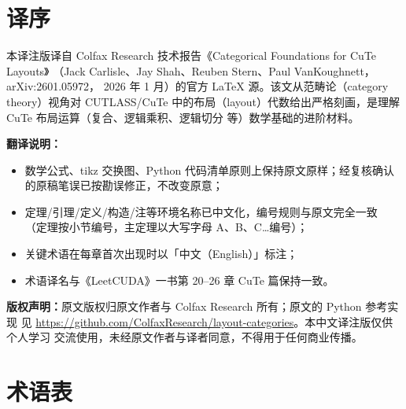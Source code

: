 \chapter*{译序}

本译注版译自 Colfax Research 技术报告《Categorical Foundations for CuTe Layouts》
（Jack Carlisle、Jay Shah、Reuben Stern、Paul VanKoughnett，arXiv:2601.05972，
2026 年 1 月）的官方 LaTeX 源。该文从范畴论（category theory）视角对 CUTLASS/CuTe
中的布局（layout）代数给出严格刻画，是理解 CuTe 布局运算（复合、逻辑乘积、逻辑切分
等）数学基础的进阶材料。

\textbf{翻译说明：}
\begin{itemize}
  \item 数学公式、tikz 交换图、Python 代码清单原则上保持原文原样；经复核确认的原稿笔误已按勘误修正，不改变原意；
  \item 定理/引理/定义/构造/注等环境名称已中文化，编号规则与原文完全一致
        （定理按小节编号，主定理以大写字母 A、B、C\ldots 编号）；
  \item 关键术语在每章首次出现时以「中文（English）」标注；
  \item 术语译名与《LeetCUDA》一书第 20--26 章 CuTe 篇保持一致。
\end{itemize}

\textbf{版权声明：}原文版权归原文作者与 Colfax Research 所有；原文的 Python 参考实现
见 \url{https://github.com/ColfaxResearch/layout-categories}。本中文译注版仅供个人学习
交流使用，未经原文作者与译者同意，不得用于任何商业传播。

\chapter*{术语表}

